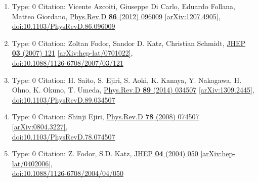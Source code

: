 \documentclass[a4paper,10pt]{article}
\begin{document}
\begin{enumerate}
\begin{enumerate}
  \item Type: 0 Citation: Vicente Azcoiti, Giuseppe Di Carlo, Eduardo Follana, Matteo Giordano, \href{https://www.doi.org/10.1103/PhysRevD.86.096009}{Phys.Rev.D {\bf 86} (2012) 096009}  \href{https://arxiv.org/abs/1207.4905}{[arXiv:1207.4905]},\\\href{https://www.doi.org/10.1103/PhysRevD.86.096009}{doi:10.1103/PhysRevD.86.096009}
  \item Type: 0 Citation: Zoltan Fodor, Sandor D. Katz, Christian Schmidt, \href{https://www.doi.org/10.1088/1126-6708/2007/03/121}{JHEP {\bf 03} (2007) 121}  \href{https://arxiv.org/abs/hep-lat/0701022}{[arXiv:hep-lat/0701022]},\\\href{https://www.doi.org/10.1088/1126-6708/2007/03/121}{doi:10.1088/1126-6708/2007/03/121}
  \item Type: 0 Citation: H. Saito, S. Ejiri, S. Aoki, K. Kanaya, Y. Nakagawa, H. Ohno, K. Okuno, T. Umeda, \href{https://www.doi.org/10.1103/PhysRevD.89.034507}{Phys.Rev.D {\bf 89} (2014) 034507}  \href{https://arxiv.org/abs/1309.2445}{[arXiv:1309.2445]},\\\href{https://www.doi.org/10.1103/PhysRevD.89.034507}{doi:10.1103/PhysRevD.89.034507}
  \item Type: 0 Citation: Shinji Ejiri, \href{https://www.doi.org/10.1103/PhysRevD.78.074507}{Phys.Rev.D {\bf 78} (2008) 074507}  \href{https://arxiv.org/abs/0804.3227}{[arXiv:0804.3227]},\\\href{https://www.doi.org/10.1103/PhysRevD.78.074507}{doi:10.1103/PhysRevD.78.074507}
  \item Type: 0 Citation: Z. Fodor, S.D. Katz, \href{https://www.doi.org/10.1088/1126-6708/2004/04/050}{JHEP {\bf 04} (2004) 050}  \href{https://arxiv.org/abs/hep-lat/0402006}{[arXiv:hep-lat/0402006]},\\\href{https://www.doi.org/10.1088/1126-6708/2004/04/050}{doi:10.1088/1126-6708/2004/04/050}

\end{enumerate}
\end{enumerate}
\end{document}
